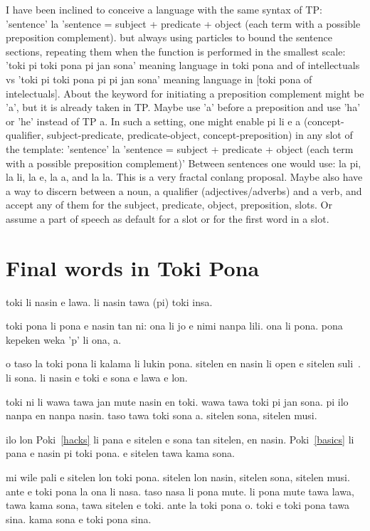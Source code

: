 I have been inclined to conceive a language with the same syntax of TP:
'sentence' la 'sentence = subject + predicate + object (each term with
a possible preposition complement).
but always using particles to bound the sentence sections,
repeating them when the function is performed in the smallest scale:
'toki pi toki pona pi jan sona' meaning
language in toki pona and of intellectuals vs
'toki pi toki pona pi pi jan sona'
meaning language in [toki pona of intelectuals].
About the keyword for initiating a preposition complement 
might be 'a', but it is already taken in TP.
Maybe use 'a' before a preposition and use 'ha' or 'he'
instead of TP a.
In such a setting,
one might enable pi li e a (concept-qualifier, subject-predicate,
predicate-object, concept-preposition)
in any slot of the template:
'sentence' la 'sentence = subject + predicate + object (each term with
a possible preposition complement)'
Between sentences one would use:
la pi, la li, la e, la a, and la la.
This is a very fractal conlang proposal.
Maybe also have a way to discern between a noun,
a qualifier (adjectives/adverbs) and a verb,
and accept any of them for the subject, predicate, object, preposition,
slots. Or assume a part of speech as default for a slot or for the
first word in a slot.

\section{Final words in Toki Pona}\label{ftp}
toki li nasin e lawa.
li nasin tawa (pi) toki insa.

toki pona li pona e nasin tan ni:
ona li jo e nimi nanpa lili.
ona li pona.
pona kepeken weka 'p' li ona, a.

o taso la toki pona li kalama li lukin pona.
sitelen en nasin li open e sitelen
suli~\cite{tpLang,kama,akesiWawa,gdoc,tokisona,Wikipesija}.
li sona. li nasin e toki e sona e lawa e lon.

toki ni li wawa tawa jan mute nasin en toki.
wawa tawa toki pi jan sona.
pi ilo nanpa en nanpa nasin.
taso tawa toki sona a.
sitelen sona, sitelen musi.

ilo lon Poki~\ref{hacks} li pana e sitelen
e sona tan sitelen,
en nasin.
Poki~\ref{basics} li pana e nasin pi toki pona.
e sitelen tawa kama sona.

mi wile pali e sitelen lon toki pona.
sitelen lon nasin, sitelen sona,
sitelen musi.
ante e toki pona
la ona li nasa.
taso nasa li pona mute.
li pona mute tawa lawa,
tawa kama sona, tawa sitelen e toki.
ante la toki pona o.
toki e toki pona tawa sina.
kama sona e toki pona sina.

